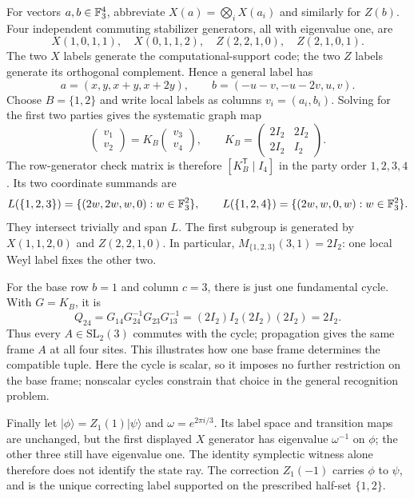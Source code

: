 For vectors \(a,b\in\mathbb F_3^4\), abbreviate
\(X(a)=\bigotimes_iX(a_i)\) and similarly for \(Z(b)\).
Four independent commuting stabilizer generators, all with eigenvalue one,
are
\[
 X(1,0,1,1),\quad X(0,1,1,2),\quad
 Z(2,2,1,0),\quad Z(2,1,0,1).
\]
The two \(X\) labels generate the computational-support code; the two
\(Z\) labels generate its orthogonal complement.  Hence a general label
has
\[
 a=(x,y,x+y,x+2y),\qquad b=(-u-v,-u-2v,u,v).
\]
Choose \(B=\{1,2\}\) and write local labels as columns \(v_i=(a_i,b_i)\).
Solving for the first two parties gives the systematic graph map
\[
 \begin{pmatrix}v_1\\v_2\end{pmatrix}
 =K_B\begin{pmatrix}v_3\\v_4\end{pmatrix},\qquad
 K_B=\begin{pmatrix}2I_2&2I_2\\2I_2&I_2\end{pmatrix}.
\]
The row-generator check matrix is therefore \([K_B^{\mathsf T}\mid I_4]\)
in the party order \(1,2,3,4\).  Its two coordinate summands are
\[
 L(\{1,2,3\})=\{(2w,2w,w,0):w\in\mathbb F_3^2\},\qquad
 L(\{1,2,4\})=\{(2w,w,0,w):w\in\mathbb F_3^2\}.
\]
They intersect trivially and span \(L\).  The first subgroup is generated
by \(X(1,1,2,0)\) and \(Z(2,2,1,0)\).  In particular,
\(M_{\{1,2,3\}}(3,1)=2I_2\): one local Weyl label fixes the other two.

For the base row \(b=1\) and column \(c=3\), there is just one
fundamental cycle.  With \(G=K_B\), it is
\[
 Q_{24}=G_{14}G_{24}^{-1}G_{23}G_{13}^{-1}
       =(2I_2)I_2(2I_2)(2I_2)=2I_2.
\]
Thus every \(A\in\mathrm{SL}_2(3)\) commutes with the cycle; propagation
gives the same frame \(A\) at all four sites.  This illustrates how one
base frame determines the compatible tuple.  Here the cycle is scalar, so
it imposes no further restriction on the base frame; nonscalar cycles
constrain that choice in the general recognition problem.

Finally let \(|\phi\rangle=Z_1(1)|\psi\rangle\) and
\(\omega=e^{2\pi i/3}\).  Its label space and transition maps are unchanged,
but the first displayed \(X\) generator has eigenvalue \(\omega^{-1}\)
on \(\phi\); the other three still have eigenvalue one.  The identity
symplectic witness alone therefore does not identify the state ray.
The correction \(Z_1(-1)\) carries \(\phi\) to \(\psi\), and is the
unique correcting label supported on the prescribed half-set \(\{1,2\}\).

